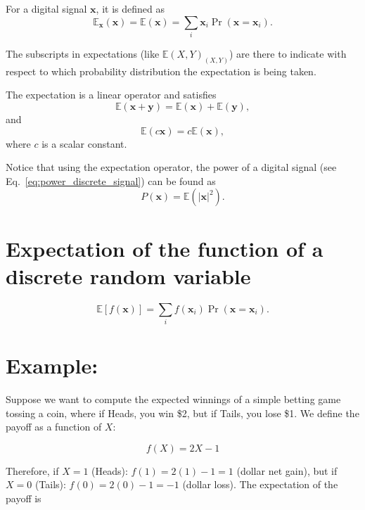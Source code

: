 For a digital signal $\mathbf{x}$, it is defined as
\begin{equation}
  \mathbb{E}_{\mathbf{x}}(\mathbf{x})=\mathbb{E}(\mathbf{x})=\sum_i\mathbf{x}_i\Pr(\mathbf{x}=\mathbf{x}_i).
  \label{eq:expectation}
\end{equation}

The subscripts in expectations (like $\mathbb{E}(X,Y)_{(X,Y)}$) are
there to indicate with respect to which probability distribution the
expectation is being taken.

The expectation is a linear operator and satisfies
\begin{equation}
  \mathbb{E}(\mathbf{x}+\mathbf{y}) = \mathbb{E}(\mathbf{x}) + \mathbb{E}(\mathbf{y}),
\end{equation}
and
\begin{equation}
  \mathbb{E}(c\mathbf{x}) = c\mathbb{E}(\mathbf{x}),
\end{equation}
where $c$ is a scalar constant.

Notice that using the expectation operator, the power of a digital
signal (see Eq.~\ref{eq:power_discrete_signal}) can be found as
\begin{equation}
  P(\mathbf{x}) = \mathbb{E}(|\mathbf{x}|^2).
  \label{eq:power_as_expectation}
\end{equation}

\section{Expectation of the function of a discrete random variable}
\begin{equation}
  \mathbb{E}[f(\mathbf{x})]=\sum_if(\mathbf{x}_i)\Pr(\mathbf{x}=\mathbf{x}_i).
  \label{eq:expectation_of_function}
\end{equation}

\section*{Example:}
Suppose we want to compute the expected winnings of a simple betting game tossing a coin, where if Heads, you win \$2, but if Tails, you lose \$1. We define the payoff as a function of $X$:

\begin{equation*}
  f(X)=2X-1
\end{equation*}

Therefore, if $X=1$ (Heads): $f(1)=2(1)-1=1$ (dollar net gain), but if $X=0$ (Tails): $f(0)=2(0)-1=-1$ (dollar loss). The expectation of the payoff is

